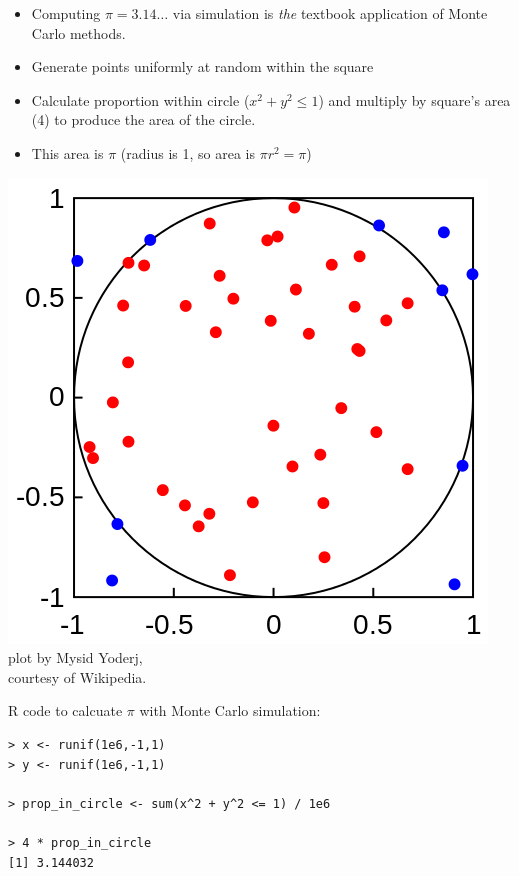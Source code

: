 \documentclass[10pt]{report}
\begin{document}
\noindent
\begin{minipage}[t]{0.65\textwidth}
\begin{itemize}
\item Computing $\pi = 3.14\ldots$ via simulation is \emph{the} textbook application
of Monte Carlo methods.
\vfill
\item Generate points uniformly at random within the square
\item Calculate proportion within circle ($x^2 + y^2 \leq 1$) and multiply by square's area (4) to produce the area of the circle.
\item This area is $\pi$ (radius is 1, so area is $\pi r^2 = \pi$)
\end{itemize}
\end{minipage}
%
\hfill
\begin{minipage}[t]{0.2\textwidth}
\vspace*{12pt}
\hfill \includegraphics[height=\textwidth]{img/mc-integration-wikipedia.png}
\\[4pt]
{\tiny plot by Mysid Yoderj,\\ courtesy of Wikipedia.}
\end{minipage}
\vfill


%
\begin{subitemize}
\item R code to calcuate $\pi$ with Monte Carlo simulation:
\\[-8pt]
{\small
\begin{Verbatim}
> x <- runif(1e6,-1,1)
> y <- runif(1e6,-1,1)

> prop_in_circle <- sum(x^2 + y^2 <= 1) / 1e6

> 4 * prop_in_circle
[1] 3.144032
\end{Verbatim}
}
\end{subitemize}
\end{document}
